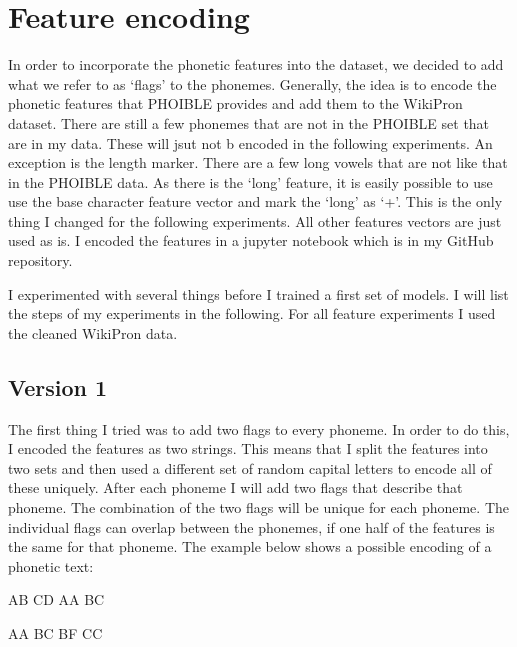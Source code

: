 \section{Feature encoding}
\label{sec:feature_enc}
In order to incorporate the phonetic features into the dataset, we decided to add what we refer to as `flags' to the phonemes. Generally, the idea is to encode the phonetic features that PHOIBLE provides and add them to the WikiPron dataset.  There are still a few phonemes that are not in the PHOIBLE set that are in my data. These will jsut not b encoded in the following experiments. An exception is the length marker. There are a few long vowels that are not like that in the PHOIBLE data. As there is the `long' feature, it is easily possible to use use the base character feature vector and mark the `long' as `+'. This is the only thing I changed for the following experiments. All other features vectors are just used as is. I encoded the features in a jupyter notebook which is in my GitHub repository.

I experimented with several things before I trained a first set of models. I will list the steps of my experiments in the following. For all feature experiments I used the cleaned WikiPron data.

\subsection*{Version 1}

The first thing I tried was to add two flags to every phoneme. In order to do this, I encoded the features as two strings. This means that I split the features into two sets and then used a different set of random capital letters to encode all of these uniquely. After each phoneme I will add two flags that describe that phoneme. The combination of the two flags will be unique for each phoneme. The individual flags can overlap between the phonemes, if one half of the features is the same for that phoneme. The example below shows a possible encoding of a phonetic text:

\begin{covexamples}
\item \label{ex1}  AB CD  AA BC
\item \label{ex2}  AA BC   BF CC
\end{covexamples}

